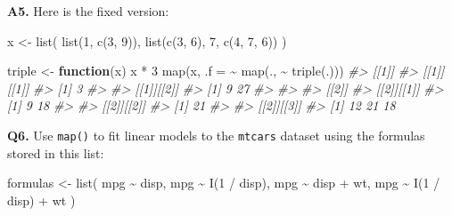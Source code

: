 \documentclass[
]{book}
\newenvironment{Shaded}{\begin{snugshade}}{\end{snugshade}}
\newcommand{\AttributeTok}[1]{\textcolor[rgb]{0.77,0.63,0.00}{#1}}
\newcommand{\CommentTok}[1]{\textcolor[rgb]{0.56,0.35,0.01}{\textit{#1}}}
\newcommand{\ControlFlowTok}[1]{\textcolor[rgb]{0.13,0.29,0.53}{\textbf{#1}}}
\newcommand{\DecValTok}[1]{\textcolor[rgb]{0.00,0.00,0.81}{#1}}
\newcommand{\FunctionTok}[1]{\textcolor[rgb]{0.00,0.00,0.00}{#1}}
\newcommand{\NormalTok}[1]{#1}
\newcommand{\OtherTok}[1]{\textcolor[rgb]{0.56,0.35,0.01}{#1}}
\newcommand{\SpecialCharTok}[1]{\textcolor[rgb]{0.00,0.00,0.00}{#1}}
\begin{document}
\textbf{A5.} Here is the fixed version:

\begin{Shaded}
\begin{Highlighting}[]
\NormalTok{x }\OtherTok{\textless{}{-}} \FunctionTok{list}\NormalTok{(}
  \FunctionTok{list}\NormalTok{(}\DecValTok{1}\NormalTok{, }\FunctionTok{c}\NormalTok{(}\DecValTok{3}\NormalTok{, }\DecValTok{9}\NormalTok{)),}
  \FunctionTok{list}\NormalTok{(}\FunctionTok{c}\NormalTok{(}\DecValTok{3}\NormalTok{, }\DecValTok{6}\NormalTok{), }\DecValTok{7}\NormalTok{, }\FunctionTok{c}\NormalTok{(}\DecValTok{4}\NormalTok{, }\DecValTok{7}\NormalTok{, }\DecValTok{6}\NormalTok{))}
\NormalTok{)}

\NormalTok{triple }\OtherTok{\textless{}{-}} \ControlFlowTok{function}\NormalTok{(x) x }\SpecialCharTok{*} \DecValTok{3}
\FunctionTok{map}\NormalTok{(x, }\AttributeTok{.f =} \SpecialCharTok{\textasciitilde{}} \FunctionTok{map}\NormalTok{(., }\SpecialCharTok{\textasciitilde{}} \FunctionTok{triple}\NormalTok{(.)))}
\CommentTok{\#\textgreater{} [[1]]}
\CommentTok{\#\textgreater{} [[1]][[1]]}
\CommentTok{\#\textgreater{} [1] 3}
\CommentTok{\#\textgreater{} }
\CommentTok{\#\textgreater{} [[1]][[2]]}
\CommentTok{\#\textgreater{} [1]  9 27}
\CommentTok{\#\textgreater{} }
\CommentTok{\#\textgreater{} }
\CommentTok{\#\textgreater{} [[2]]}
\CommentTok{\#\textgreater{} [[2]][[1]]}
\CommentTok{\#\textgreater{} [1]  9 18}
\CommentTok{\#\textgreater{} }
\CommentTok{\#\textgreater{} [[2]][[2]]}
\CommentTok{\#\textgreater{} [1] 21}
\CommentTok{\#\textgreater{} }
\CommentTok{\#\textgreater{} [[2]][[3]]}
\CommentTok{\#\textgreater{} [1] 12 21 18}
\end{Highlighting}
\end{Shaded}

\textbf{Q6.} Use \texttt{map()} to fit linear models to the \texttt{mtcars} dataset using the formulas stored in this list:

\begin{Shaded}
\begin{Highlighting}[]
\NormalTok{formulas }\OtherTok{\textless{}{-}} \FunctionTok{list}\NormalTok{(}
\NormalTok{  mpg }\SpecialCharTok{\textasciitilde{}}\NormalTok{ disp,}
\NormalTok{  mpg }\SpecialCharTok{\textasciitilde{}} \FunctionTok{I}\NormalTok{(}\DecValTok{1} \SpecialCharTok{/}\NormalTok{ disp),}
\NormalTok{  mpg }\SpecialCharTok{\textasciitilde{}}\NormalTok{ disp }\SpecialCharTok{+}\NormalTok{ wt,}
\NormalTok{  mpg }\SpecialCharTok{\textasciitilde{}} \FunctionTok{I}\NormalTok{(}\DecValTok{1} \SpecialCharTok{/}\NormalTok{ disp) }\SpecialCharTok{+}\NormalTok{ wt}
\NormalTok{)}
\end{Highlighting}
\end{Shaded}
\end{document}
